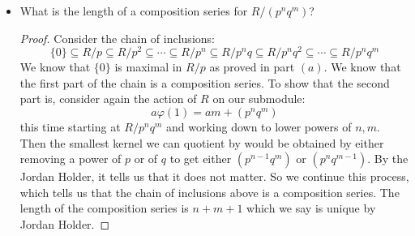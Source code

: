 \documentclass{article}
\begin{document}
\begin{itemize}
\begin{proof}
\begin{align*}
                        \varphi(1) &= m + (p^{i + 1})             
                    \end{align*}
                So we have
                    \begin{equation*}
                        a\varphi(1) = am + (p^{i + 1})
                    \end{equation*}
                By unique factorization, we know that the kernel is of the form $(p^{k})$ for some $k \leq i + 1$. This is because if there are $j$ factors of $p$ in $m$, then there are at least $i + 1 - j$ factors of $p$ in $a$ if $am \in \ker{\varphi}$. So to get the maximal submodule, we quotient by the smallest kernel that does not give us back the same module which is $(p^{i})$. So therefore, the maximal submodule of $R/p^{j}$ is $R/p^{j - 1}$ thereby showing that this is a composition series. By Jordan Holder, we know that all other composition series are the same. So the length is $n + 1$.
            \end{proof}

        \item What is the length of a composition series for $R/(p^{n}q^{m})$?
            \begin{proof}
                Consider the chain of inclusions:
                    \begin{equation*}
                        \{0\} \subseteq R/p \subseteq R/p^{2} \subseteq \cdots \subseteq R/p^{n} \subseteq R/p^{n}q \subseteq R/p^{n}q^{2}\subseteq \cdots \subseteq R/p^{n}q^{m}
                    \end{equation*}
                We know that $\{0\}$ is maximal in $R/p$ as proved in part $(a)$. We know that the first part of the chain is a composition series. To show that the second part is, consider again the action of $R$ on our submodule:
                    \begin{equation*}
                        a\varphi(1) = am + (p^{n}q^{m})
                    \end{equation*}
                this time starting at $R/p^{n}q^{m}$ and working down to lower powers of $n, m$. Then the smallest kernel we can quotient by would be obtained by either removing a power of $p$ or of $q$ to get either $(p^{n - 1}q^{m})$ or $(p^{n}q^{m - 1})$. By the Jordan Holder, it tells us that it does not matter. So we continue this process, which tells us that the chain of inclusions above is a composition series. The length of the composition series is $n + m + 1$ which we say is unique by Jordan Holder.
            \end{proof}


\end{itemize}
\end{document}

